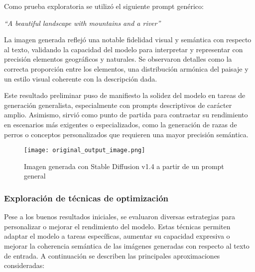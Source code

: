 Como prueba exploratoria se utilizó el siguiente prompt genérico:

\begin{center}
\textit{``A beautiful landscape with mountains and a river''}
\end{center}

La imagen generada reflejó una notable fidelidad visual y semántica con respecto al texto, validando la capacidad del modelo para interpretar y representar con precisión elementos geográficos y naturales. Se observaron detalles como la correcta proporción entre los elementos, una distribución armónica del paisaje y un estilo visual coherente con la descripción dada.

Este resultado preliminar puso de manifiesto la solidez del modelo en tareas de generación generalista, especialmente con prompts descriptivos de carácter amplio. Asimismo, sirvió como punto de partida para contrastar su rendimiento en escenarios más exigentes o especializados, como la generación de razas de perros o conceptos personalizados que requieren una mayor precisión semántica.

\begin{figure}[H]
\centering
\texttt{[image: original\_output\_image.png]}
\caption{Imagen generada con Stable Diffusion v1.4 a partir de un prompt general}
\label{fig:original_image}
\end{figure}

\subsubsection{Exploración de técnicas de optimización}
Pese a los buenos resultados iniciales, se evaluaron diversas estrategias para personalizar o mejorar el rendimiento del modelo. Estas técnicas permiten adaptar el modelo a tareas específicas, aumentar su capacidad expresiva o mejorar la coherencia semántica de las imágenes generadas con respecto al texto de entrada. A continuación se describen las principales aproximaciones consideradas:

